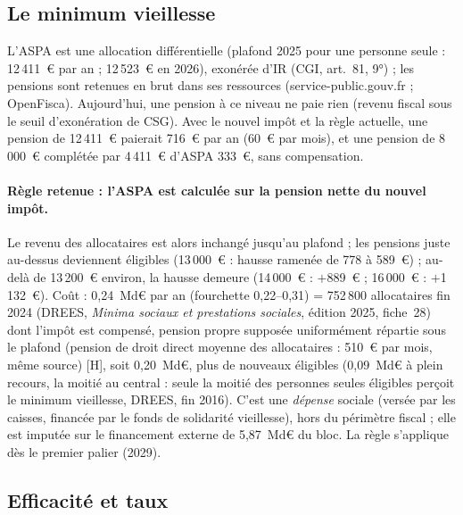 \subsection{Le minimum vieillesse}\label{ann:ircsg_aspa}

L'ASPA est une allocation différentielle (plafond 2025 pour une personne seule : 12\,411~€ par an ; 12\,523~€ en 2026), exonérée d'IR (CGI, art.~81, 9°) ; les pensions sont retenues en brut dans ses ressources (service-public.gouv.fr ; OpenFisca). Aujourd'hui, une pension à ce niveau ne paie rien (revenu fiscal sous le seuil d'exonération de CSG). Avec le nouvel impôt et la règle actuelle, une pension de 12\,411~€ paierait 716~€ par an (60~€ par mois), et une pension de 8\,000~€ complétée par 4\,411~€ d'ASPA 333~€, sans compensation.

\paragraph{Règle retenue : l'ASPA est calculée sur la pension nette du nouvel impôt.} Le revenu des allocataires est alors inchangé jusqu'au plafond ; les pensions juste au-dessus deviennent éligibles (13\,000~€ : hausse ramenée de 778 à 589~€) ; au-delà de 13\,200~€ environ, la hausse demeure (14\,000~€ : $+$889~€ ; 16\,000~€ : $+$1\,132~€). Coût : 0,24~Md€ par an (fourchette 0,22--0,31) = 752\,800 allocataires fin 2024 (DREES, \emph{Minima sociaux et prestations sociales}, édition 2025, fiche~28) dont l'impôt est compensé, pension propre supposée uniformément répartie sous le plafond (pension de droit direct moyenne des allocataires : 510~€ par mois, même source) [H], soit 0,20~Md€, plus de nouveaux éligibles (0,09~Md€ à plein recours, la moitié au central : seule la moitié des personnes seules éligibles perçoit le minimum vieillesse, DREES, fin 2016). C'est une \emph{dépense} sociale (versée par les caisses, financée par le fonds de solidarité vieillesse), hors du périmètre fiscal ; elle est imputée sur le financement externe de 5,87~Md€ du bloc. La règle s'applique dès le premier palier (2029).

\subsection{Efficacité et taux}

